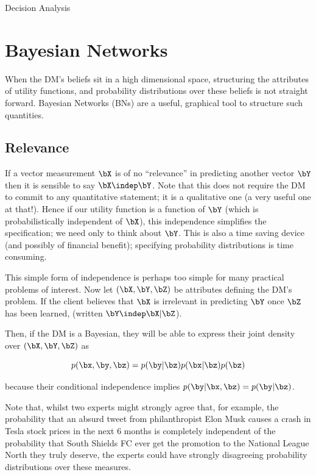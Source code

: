 \begin{chapter}{Decision Analysis \label{Ch:decision}}
\section{Bayesian Networks \label{Sec:BNs} }

When the DM's beliefs sit in a high dimensional space, structuring the attributes of utility functions, and probability distributions over these beliefs is not straight forward. Bayesian Networks (BNs) are a useful, graphical tool to structure such quantities.

\subsection{Relevance}

If a vector measurement $\bX$ is of no ``relevance'' in predicting another vector $\bY$ then it is sensible to say $\bX \indep \bY$. Note that this does not require the DM to commit to any quantitative statement; it is a qualitative one (a very useful one at that!). Hence if our utility function is a function of $\bY$ (which is probabilistically independent of $\bX$), this independence simplifies the specification; we need only to think about $\bY$. This is also a time saving device (and possibly of financial benefit); specifying probability distributions is time consuming.

This simple form of independence is perhaps too simple for many practical problems of interest. Now let $(\bX, \bY, \bZ)$ be attributes defining the DM's problem. If the client believes that $\bX$ is irrelevant in predicting $\bY$ once $\bZ$ has been learned, (written $\bY \indep \bX | \bZ$).

Then, if the DM is a Bayesian, they will be able to express their joint density over $(\bX, \bY, \bZ)$ as

\begin{equation}
p(\bx, \by, \bz) = p(\by | \bz) p(\bx | \bz) p(\bz)
\end{equation}

because their conditional independence implies $p(\by | \bx, \bz) = p(\by | \bz)$.

Note that, whilst two experts might strongly agree that, for example, the probability that an absurd tweet from philanthropist Elon Musk causes a crash in Tesla stock prices in the next $6$ months is completely independent of the probability that South Shields FC ever get the promotion to the National League North they truly deserve, the experts could have strongly disagreeing probability distributions over these measures.


\end{chapter}
